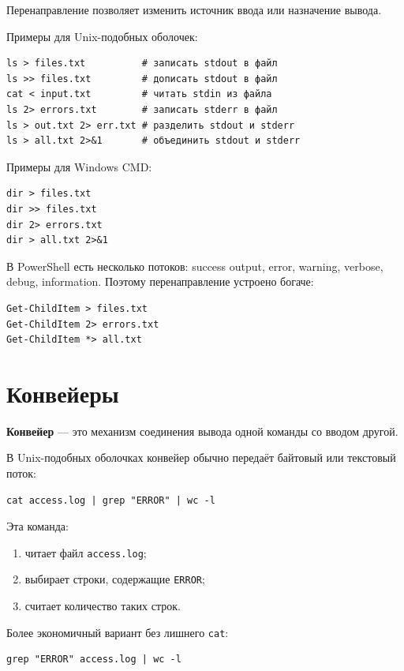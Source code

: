 \documentclass[12pt,a4paper]{article}
\begin{document}
Перенаправление позволяет изменить источник ввода или назначение вывода.

Примеры для Unix-подобных оболочек:

\begin{lstlisting}
ls > files.txt          # записать stdout в файл
ls >> files.txt         # дописать stdout в файл
cat < input.txt         # читать stdin из файла
ls 2> errors.txt        # записать stderr в файл
ls > out.txt 2> err.txt # разделить stdout и stderr
ls > all.txt 2>&1       # объединить stdout и stderr
\end{lstlisting}

Примеры для Windows CMD:

\begin{lstlisting}
dir > files.txt
dir >> files.txt
dir 2> errors.txt
dir > all.txt 2>&1
\end{lstlisting}

В PowerShell есть несколько потоков: success output, error, warning, verbose, debug, information. Поэтому перенаправление устроено богаче:

\begin{lstlisting}
Get-ChildItem > files.txt
Get-ChildItem 2> errors.txt
Get-ChildItem *> all.txt
\end{lstlisting}

\section{Конвейеры}

\textbf{Конвейер} --- это механизм соединения вывода одной команды со вводом другой.

В Unix-подобных оболочках конвейер обычно передаёт байтовый или текстовый поток:

\begin{lstlisting}
cat access.log | grep "ERROR" | wc -l
\end{lstlisting}

Эта команда:
\begin{enumerate}
    \item читает файл \texttt{access.log};
    \item выбирает строки, содержащие \texttt{ERROR};
    \item считает количество таких строк.
\end{enumerate}

Более экономичный вариант без лишнего \texttt{cat}:

\begin{lstlisting}
grep "ERROR" access.log | wc -l
\end{lstlisting}
\end{document}
